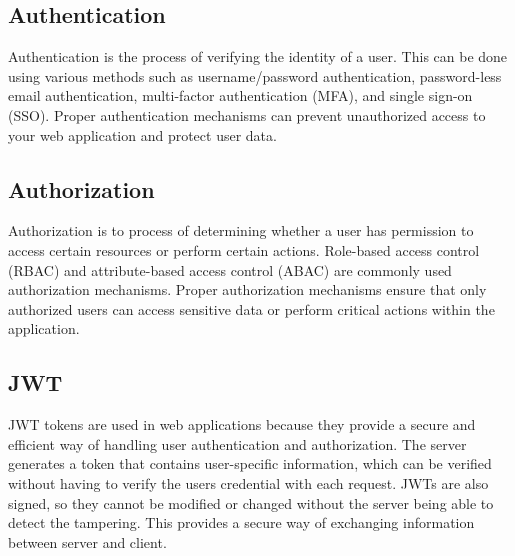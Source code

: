 


\subsection{Authentication}

Authentication is the process of verifying the identity of a user. This can be done using various methods such as username/password authentication, password-less email authentication, multi-factor authentication (MFA), and single sign-on (SSO). Proper authentication mechanisms can prevent unauthorized access to your web application and protect user data. \cite{dzone_authentication}

\subsection{Authorization}

Authorization is to process of determining whether a user has permission to access certain resources or perform certain actions. Role-based access control (RBAC) and attribute-based access control (ABAC) are commonly used authorization mechanisms. Proper authorization mechanisms ensure that only authorized users can access sensitive data or perform critical actions within the application. \cite{csharpcorner_authorization}

\subsection{JWT}

JWT tokens are used in web applications because they provide a secure and efficient way of handling user authentication and authorization. The server generates a token that contains user-specific information, which can be verified without having to verify the users credential with each request. JWTs are also signed, so they cannot be modified or changed without the server being able to detect the tampering. This provides a secure way of exchanging information between server and client. \cite{logrocket_JWT}

